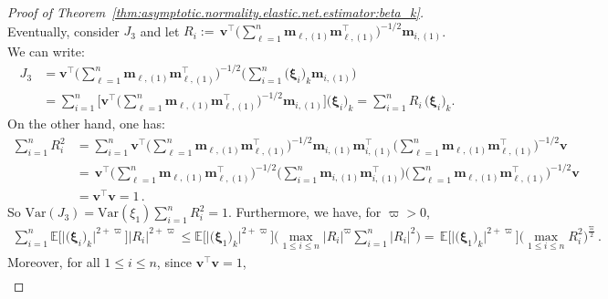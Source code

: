\documentclass[
  12pt]{article}
\newcommand{\Var}{\mbox{Var}}
\def\M{\mathbf{m}}
\begin{document}
\begin{proof}[Proof of Theorem~\ref{thm:asymptotic.normality.elastic.net.estimator:beta_k}]
	Eventually, consider $J_{3}$ and let $R_{i} := \,  \mathbf{v}^{\top}   \Big( \sum_{\ell = 1}^{n} \M_{\ell,(1)}  \M_{\ell,(1)}^{\top} \Big)^{-1/2}     \M_{i,(1)} $. We can write: 
	\begin{align*}
		J_{3}  &=  \mathbf{v}^{\top}   \Big( \sum_{\ell = 1}^{n} \M_{\ell,(1)}  \M_{\ell,(1)}^{\top} \Big)^{-1/2}   \Big(  \sum_{i = 1}^{n} \big( \bm{\xi}_{i} \big)_{k}  \M_{i,(1)}  \Big)  
		\\
		&=   \sum_{i = 1}^{n}  \Big[  \mathbf{v}^{\top}  \Big(  \sum_{\ell = 1}^{n} \M_{\ell,(1)}  \M_{\ell,(1)}^{\top} \Big)^{-1/2}     \M_{i,(1)}  \Big]    \big( \bm{\xi}_{i} \big)_{k}  
		=  \sum_{i = 1}^{n}  R_{i}  \,   \big( \bm{\xi}_{i} \big)_{k}   . 
	\end{align*}
	On the other hand, one has: 
	\begin{align}
		\sum_{i = 1}^{n}  R_{i}^{2}   &=        \sum_{i = 1}^{n}   \mathbf{v}^{\top}  \Big(  \sum_{\ell = 1}^{n} \M_{\ell,(1)}  \M_{\ell,(1)}^{\top} \Big)^{-1/2}     \M_{i,(1)}   \M_{i,(1)}^{\top}    \Big( \sum_{\ell = 1}^{n} \M_{\ell,(1)}  \M_{\ell,(1)}^{\top} \Big)^{-1/2}  \mathbf{v}
		\nonumber  
		\\
		&=   \, \mathbf{v}^{\top}  \Big(  \sum_{\ell = 1}^{n} \M_{\ell,(1)}  \M_{\ell,(1)}^{\top} \Big)^{-1/2} 
		\Big( \sum_{i = 1}^{n} \M_{i,(1)}  \M_{i,(1)}^{\top} \Big)     
		\Big( \sum_{\ell = 1}^{n} \M_{\ell,(1)}  \M_{\ell,(1)}^{\top} \Big)^{-1/2}  \mathbf{v} 
		\nonumber   
		\\
		&=  \mathbf{v}^{\top}  \mathbf{v}   =  1  \,. 
		\label{asymptotic.normality:Lyapunov.condition:cond1}
	\end{align}
	So $\Var(J_{3}) = \Var(\xi_{1}) \displaystyle \sum_{i = 1}^{n}  R_{i}^{2} = 1 $. 
	Furthermore, we have, for $\varpi > 0 $, 
	\begin{align*}
		\sum_{i = 1}^{n}  \mathbb{E} \Big[  \big| \big( \bm{\xi}_{i} \big)_{k} \big|^{2 + \varpi} \Big] \big| R_{i} \big|^{2 + \varpi}   \leq   
		\mathbb{E} \big[  \big| \big( \bm{\xi}_{1} \big)_{k} \big|^{2 + \varpi}  \big]  \Big( \max_{1 \leq i \leq n} \big| R_{i} \big|^{ \varpi}  \sum_{i = 1}^{n}  \big| R_{i} \big|^{2}  \Big)  
		=  \,  \mathbb{E} \big[  \big| \big( \bm{\xi}_{1} \big)_{k} \big|^{2 + \varpi}  \big]   \Big(  \max_{1 \leq i \leq n}  R_{i}^{2}  \Big)^{\frac{\varpi}{2}}  \,. 
	\end{align*}
	Moreover, for all $1 \leq i \leq n$, since $\mathbf{v}^{\top} \mathbf{v}  =  1$,  
	\begin{align*}

\end{align*}
\end{proof}
\end{document}
